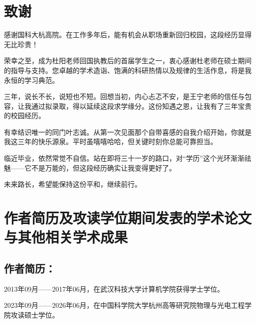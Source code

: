 
\chapter[致谢]{致\quad 谢}%

感谢国科大杭高院。在工作多年后，能有机会从职场重新回归校园，这段经历显得无比珍贵！

荣幸之至，成为杜阳老师回国执教后的首届学生之一，衷心感谢杜老师在硕士期间的指导与支持。您卓越的学术造诣、饱满的科研热情以及规律的生活作息，将是我永恒的学习典范。

三年，说长不长，说短也不短。回想当初，内心忐忑不安，是王宁老师的信任与包容，让我通过拟录取，得以延续这段求学缘分。这份知遇之恩，让我有了三年宝贵的校园经历。

有幸结识唯一的同门叶志诚。从第一次见面那个自带喜感的自我介绍开始，你就是我这三年的快乐源泉。平时虽嘻嘻哈哈，但关键时刻你总能可靠担当。

临近毕业，依然常觉不自信。站在即将三十一岁的路口，对“学历”这个光环渐渐祛魅——它不是万能的，但这段经历确实让我变得更好了。

未来路长，希望能保持这份平和，继续前行。

\vspace{3\baselineskip}

\chapter{作者简历及攻读学位期间发表的学术论文与其他相关学术成果}

\section*{作者简历：}
2013年09月——2017年06月，在武汉科技大学计算机学院获得学士学位。

2023年09月——2026年06月，在中国科学院大学杭州高等研究院物理与光电工程学院攻读硕士学位。

